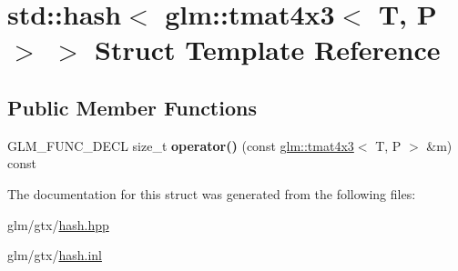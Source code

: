 \hypertarget{structstd_1_1hash_3_01glm_1_1tmat4x3_3_01T_00_01P_01_4_01_4}{\section{std\-:\-:hash$<$ glm\-:\-:tmat4x3$<$ T, P $>$ $>$ Struct Template Reference}
\label{structstd_1_1hash_3_01glm_1_1tmat4x3_3_01T_00_01P_01_4_01_4}
}
\subsection*{Public Member Functions}
\begin{DoxyCompactItemize}
\item 
\hypertarget{structstd_1_1hash_3_01glm_1_1tmat4x3_3_01T_00_01P_01_4_01_4_ad9a4b8c45e2f5a9d93e28a3a6c5bdf42}{G\-L\-M\-\_\-\-F\-U\-N\-C\-\_\-\-D\-E\-C\-L size\-\_\-t {\bfseries operator()} (const \hyperlink{structglm_1_1tmat4x3}{glm\-::tmat4x3}$<$ T, P $>$ \&m) const }\label{structstd_1_1hash_3_01glm_1_1tmat4x3_3_01T_00_01P_01_4_01_4_ad9a4b8c45e2f5a9d93e28a3a6c5bdf42}

\end{DoxyCompactItemize}


The documentation for this struct was generated from the following files\-:\begin{DoxyCompactItemize}
\item 
glm/gtx/\hyperlink{hash_8hpp}{hash.\-hpp}\item 
glm/gtx/\hyperlink{hash_8inl}{hash.\-inl}\end{DoxyCompactItemize}
